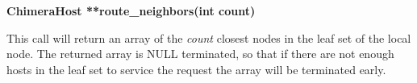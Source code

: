 {\noindent \bf ChimeraHost **route\_neighbors(int count)}

This call will return an array of
the {\em count} closest nodes in the leaf set of the local node. The
returned array is NULL terminated, so that if there are not enough hosts
in the leaf set to service the request the array will be terminated early.

